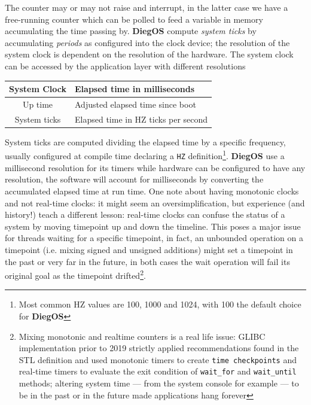 \documentclass[11pt,b5paper]{scrbook}
\newcommand{\myOS}{{\color{SteelBlue}\textbf{DiegOS}}}
\begin{document}
The counter may or may not raise and interrupt,
in the latter case we have a free-running counter which can
be polled to feed a variable in memory accumulating the time passing by.
{\myOS} compute \textit{system ticks} by accumulating \textit{periods} as configured into the clock device;
the resolution of the system clock is dependent on the resolution of the hardware.
The system clock can be accessed by the application layer with different resolutions

\hfill
\begin{tcolorbox}[enhanced, colframe=LightSalmon!60!White, coltitle=Black, adjusted title=Time measurement, top=5mm, bottom=5mm, halign=center, drop fuzzy shadow]
\begin{center}
    \begin{tabular}{| c | l |}
    \hline
    System Clock & Elapsed time in milliseconds \\ \hline
    Up time & Adjusted elapsed time since boot \\ \hline
    System ticks & Elapsed time in HZ ticks per second \\
    \hline
    \end{tabular}
\end{center}
\end{tcolorbox}
\hfill

System ticks are computed dividing the elapsed time by a specific frequency, usually configured at compile time
declaring a \texttt{HZ} definition\footnote{Most common HZ values are 100, 1000 and 1024, with 100 the default
choice for {\myOS}}.
{\myOS} use a millisecond resolution for its timers while hardware can be configured to have any resolution,
the software will account for milliseconds by converting the accumulated elapsed time at run time.
One note about having monotonic clocks and not real-time clocks: it might seem an oversimplification, but experience (and history!)
teach a different lesson: real-time clocks can confuse the status of a system by moving timepoint up and down the timeline.
This poses a major issue for threads waiting for a specific timepoint, in fact, an unbounded operation on a timepoint
(i.e. mixing signed and unsigned additions) might set a timepoint in the past or very far in the future, in both cases
the wait operation will fail its original goal as the timepoint drifted\footnote{Mixing monotonic and realtime counters
is a real life issue: GLIBC implementation prior to 2019 strictly applied recommendations found in the STL definition
and used monotonic timers to create \texttt{time checkpoints} and real-time timers to evaluate the exit condition
of \texttt{wait\_for} and \texttt{wait\_until} methods; altering system time --- from the system console for example ---
to be in the past or in the future made applications hang forever}.
\end{document}
